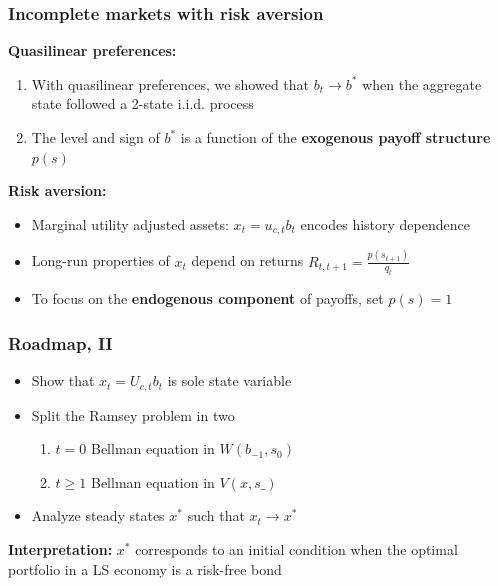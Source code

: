 \documentclass{beamer}
\begin{document}
\begin{frame}
 \frametitle{Incomplete markets with risk aversion}
 \textbf{Quasilinear preferences: }
 \begin{enumerate}
  \item With quasilinear preferences, we showed that $b_t\to b^*$ when the aggregate state followed a 2-state i.i.d. process
  \item The level  and sign of $b^*$ is a function of the \textbf{exogenous payoff structure} $p(s)$
 \end{enumerate}

 \textbf{Risk aversion:}
  \begin{itemize}
   \item Marginal utility adjusted assets: $x_t=u_{c,t}b_{t}$ encodes history dependence
   \item Long-run properties of $x_t$ depend on returns $R_{t,t+1}=\frac{p(s_{t+1})}{q_t}$
   \item To focus on the \textbf{endogenous component} of payoffs, set  $p(s)=1$
  \end{itemize}
  \end{frame}
%
\begin{frame}
\frametitle{Roadmap, II}
\begin{itemize}

\item Show that $x_t=U_{c,t}b_{t}$ is sole state variable

\item Split the Ramsey problem in two
\begin{enumerate}
 \item  $t=0$ Bellman equation in $W(b_{-1},s_0)$ %
 \item  $t\geq 1$ Bellman equation in $V(x,s\_)$
\end{enumerate}

\item Analyze steady states $x^*$ such that $x_t \to x^*$

\end{itemize}
\textbf{Interpretation:}  $x^*$  corresponds to an initial condition when the optimal portfolio in a LS economy is a risk-free bond

\end{frame}
\end{document}
